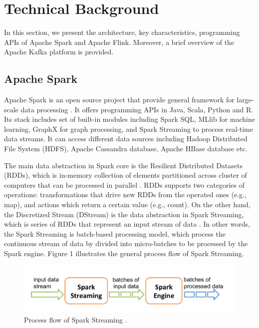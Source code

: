 \documentclass[]{article}
\begin{document}
\section{Technical Background}
 In this section, we present the architecture, key characteristics, programming APIs  of Apache Spark and Apache Flink. Moreover, a brief overview of the Apache Kafka platform is  provided.

\subsection{Apache Spark}

\par Apache Spark is an open source project that provide general framework for large-scale data processing \cite{spark}. It offers programming APIs in Java, Scala, Python and R. Its stack includes set of built-in modules including Spark SQL, MLlib for machine learning, GraphX for graph processing, and Spark Streaming to process real-time data streams. It can access different data sources including Hadoop Distributed File System (HDFS), Apache Cassandra database, Apache HBase database etc.

\par The main data abstraction in Spark core is the Resilient Distributed Datasets (RDDs), which is in-memory collection of elements partitioned across cluster of computers that can be processed in parallel \cite{rdd}. RDDs supports two categories of operations: transformations that drive new RDDs from the operated ones (e.g., map), and actions which return a certain value (e.g., count). On the other hand, the Discretized Stream (DStream) is the data abstraction in Spark Streaming, which is series of RDDs that represent an input stream of data \cite{spark_streaming}. In other words, the Spark Streaming is batch-based processing model, which process the continuous stream of data by divided into micro-batches to be processed by the Spark engine. Figure 1 illustrates the general process flow of Spark Streaming. 


\begin{figure}[h]
 
  \centering
    \includegraphics[width=.9\textwidth, height=.2\textheight]{streaming-flow.png}
     \caption{ Process flow of Spark Streaming \cite{spark_streaming}.}
\end{figure} 
\end{document}
